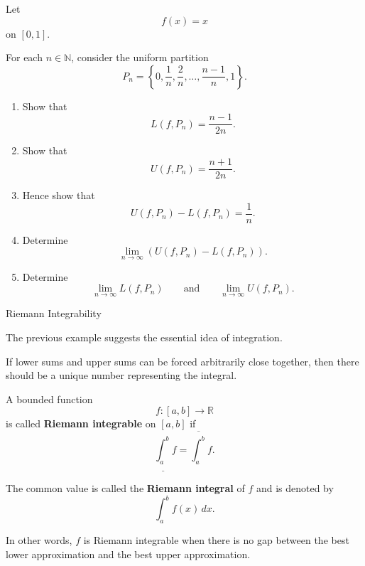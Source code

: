 \documentclass[12pt,a4paper]{article}
\begin{document}
\begin{problem}
Let
\[
f(x)=x
\]
on $[0,1]$.

For each $n\in\mathbb{N}$, consider the uniform partition
\[
P_n=
\left\{
0,\frac1n,\frac2n,\dots,\frac{n-1}{n},1
\right\}.
\]

\begin{enumerate}
    \item Show that
    \[
    L(f,P_n)
    =
    \frac{n-1}{2n}.
    \]

    \item Show that
    \[
    U(f,P_n)
    =
    \frac{n+1}{2n}.
    \]

    \item Hence show that
    \[
    U(f,P_n)-L(f,P_n)
    =
    \frac1n.
    \]

    \item Determine
    \[
    \lim_{n\to\infty}
    \left(
    U(f,P_n)-L(f,P_n)
    \right).
    \]

    \item Determine
    \[
    \lim_{n\to\infty}L(f,P_n)
    \qquad\text{and}\qquad
    \lim_{n\to\infty}U(f,P_n).
    \]
\end{enumerate}
\end{problem}

\clearpage

\begin{heading}
Riemann Integrability
\end{heading}

The previous example suggests the essential idea of integration.

If lower sums and upper sums can be forced arbitrarily close together,
then there should be a unique number representing the integral.

\begin{definition}
A bounded function
\[
f:[a,b]\to\mathbb{R}
\]
is called \textbf{Riemann integrable} on $[a,b]$ if
\[
\underline{\int_a^b} f
=
\overline{\int_a^b} f.
\]

The common value is called the \textbf{Riemann integral} of $f$ and
is denoted by
\[
\int_a^b f(x)\,dx.
\]
\end{definition}

\vspace{20pt}

In other words, $f$ is Riemann integrable when there is no gap between
the best lower approximation and the best upper approximation.
\end{document}
